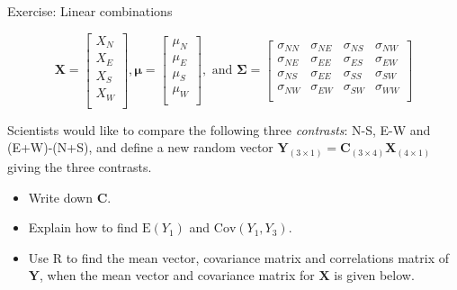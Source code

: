 \documentclass[ignorenonframetext,]{beamer}
\providecommand{\tightlist}{%
  \setlength{\itemsep}{0pt}\setlength{\parskip}{0pt}}
\begin{document}
\begin{frame}

\begin{block}{Exercise: Linear combinations}

\[\boldsymbol{X}=\left[ \begin{array}{c} X_N\\
          X_E\\
X_S\\
          X_W\\
          \end{array}
          \right],
          \boldsymbol{\mu}=\left[
      \begin{array}{c} \mu_N\\
          \mu_E\\
\mu_S\\
          \mu_W\\
          \end{array}
          \right], \text{ and } \boldsymbol\Sigma=\left[ \begin{array}{cccc}
    \sigma_{NN} & \sigma_{NE} & \sigma_{NS} & \sigma_{NW}\\
    \sigma_{NE} & \sigma_{EE} & \sigma_{ES}& \sigma_{EW}\\
        \sigma_{NS} & \sigma_{EE} & \sigma_{SS}& \sigma_{SW}\\
    \sigma_{NW} & \sigma_{EW} & \sigma_{SW} & \sigma_{WW}\\
\end{array} \right]\]

Scientists would like to compare the following three \emph{contrasts}:
N-S, E-W and (E+W)-(N+S), and define a new random vector
\(\boldsymbol{Y}_{(3\times 1)}=\boldsymbol{C}_{(3\times 4)} \boldsymbol{X}_{(4\times 1)}\)
giving the three contrasts.

\begin{itemize}
\tightlist
\item
  Write down \(\boldsymbol{C}\).
\item
  Explain how to find \(\text{E}(Y_1)\) and \(\text{Cov}(Y_1,Y_3)\).
\item
  Use R to find the mean vector, covariance matrix and correlations
  matrix of \(\boldsymbol{Y}\), when the mean vector and covariance
  matrix for \(\boldsymbol{X}\) is given below.
\end{itemize}

\end{block}

\end{frame}
\end{document}
